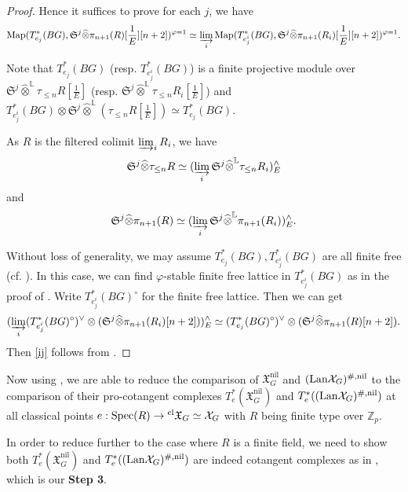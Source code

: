 \documentclass[10pt]{article}
\numberwithin{equation}{section}
\newcommand{\frakS}{{\mathfrak S}}
\newcommand{\frakX}{{\mathfrak X}}
\newcommand{\bL}{{\mathbb L}}
\newcommand{\bZ}{{\mathbb Z}}
\newcommand{\calX}{{\mathcal X}}
\newcommand{\Lan}{{\mathrm{Lan}}}
\newcommand{\Map}{\mathrm{Map}}
\newcommand{\nil}{\mathrm{nil}}
\newcommand{\Spec}{{\mathrm{Spec}}}         %
\begin{document}
\begin{proof}
     Hence it suffices to prove for each $j$, we have
     \begin{equation}\label{ij}
     \Map(T^*_{e_j}(BG),\frakS^j\widehat\otimes\pi_{n+1}(R)[\frac{1}{E}][n+2])^{\varphi=1}\simeq \varinjlim_i\Map(T^*_{e^i_j}(BG),\frakS^j\widehat\otimes\pi_{n+1}(R_i)[\frac{1}{E}][n+2])^{\varphi=1}.
     \end{equation}

     Note that $T^*_{e_j}(BG)$ (resp. $T^*_{e^i_j}(BG)$) is a finite projective module over $\frakS^j\widehat\otimes^{\bL}\tau_{\leq n}R[\frac{1}{E}]$ (resp. $\frakS^j\widehat\otimes^{\bL}\tau_{\leq n}R_i[\frac{1}{E}]$) and $T^*_{e^i_j}(BG)\otimes \frakS^j\widehat\otimes^{\bL}(\tau_{\leq n}R[\frac{1}{E}])\simeq T^*_{e_j}(BG)$.

As $R$ is the filtered colimit $\varinjlim_iR_i$, we have \[\frakS^j\widehat\otimes \tau_{\leq n}R\simeq (\varinjlim_i\frakS^j\widehat\otimes^{\bL}\tau_{\leq n}R_i)^{\wedge}_{E}\] and \[\frakS^j\widehat\otimes \pi_{n+1}(R)\simeq (\varinjlim_i\frakS^j\widehat\otimes^{\bL}\pi_{n+1}(R_i))^{\wedge}_{E}.\]

Without loss of generality, we may assume $T^*_{e_j}(BG), T^*_{e^i_j}(BG)$ are all finite free (cf. \cite[Lemma 5.2.14]{EG21}). In this case, we can find $\varphi$-stable finite free lattice in $T^*_{e^i_j}(BG)$ as in the proof of \cite[Proposition 3.31]{Min23}. Write $T^*_{e^i_j}(BG)^{\circ}$ for the finite free lattice. Then we can get
\[
(\varinjlim_i (T^*_{e^i_j}(BG)^{\circ})^{\vee}\otimes (\frakS^j\widehat\otimes\pi_{n+1}(R_i)[n+2]))^{\wedge}_E\simeq (T^*_{e_j}(BG)^{\circ})^{\vee}\otimes (\frakS^j\widehat\otimes\pi_{n+1}(R)[n+2]).
\]
Then \ref{ij} follows from \cite[Lemma 2.24]{Min23}.
\end{proof}


Now using \cite[Proposition 3.30]{Min23}, we are able to reduce the comparison of $\frakX_G^{\nil}$ and $(\Lan\calX_G)^{\#,\rm nil}$ to the comparison of their pro-cotangent complexes $T^*_e(\frakX_G^{\nil})$ and  $T^*_e((\Lan\calX_G)^{\#,\rm nil})$ at all classical points $e:\Spec(R)\to {^{\rm cl}\frakX_G}\simeq \calX_G$ with $R$ being finite type over $\bZ_p$.

In order to reduce further to the case where $R$ is a finite field, we need to show both $T^*_e(\frakX_G^{\nil})$ and  $T^*_e((\Lan\calX_G)^{\#,\rm nil})$ are indeed cotangent complexes as in \cite[Proposition 3.38 and 3.40]{Min23}, which is our \textbf{Step 3}.
\end{document}

